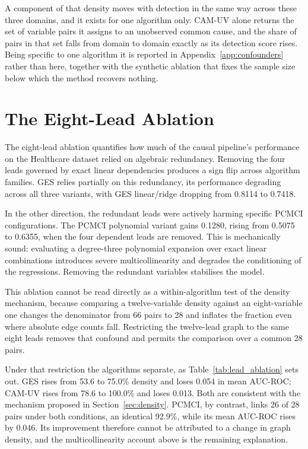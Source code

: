 A component of that density moves with detection in the same way across these three domains, and it exists for one algorithm only. CAM-UV alone returns the set of variable pairs it assigns to an unobserved common cause, and the share of pairs in that set falls from domain to domain exactly as its detection score rises. Being specific to one algorithm it is reported in Appendix~\ref{app:confounders} rather than here, together with the synthetic ablation that fixes the sample size below which the method recovers nothing.

\section{The Eight-Lead Ablation}
\label{sec:eight-lead-ablation}

The eight-lead ablation quantifies how much of the causal pipeline's performance on the Healthcare dataset relied on algebraic redundancy. Removing the four leads governed by exact linear dependencies produces a sign flip across algorithm families. GES relies partially on this redundancy, its performance degrading across all three variants, with GES linear/ridge dropping from 0.8114 to 0.7418.

In the other direction, the redundant leads were actively harming specific PCMCI configurations. The PCMCI polynomial variant gains 0.1280, rising from 0.5075 to 0.6355, when the four dependent leads are removed. This is mechanically sound: evaluating a degree-three polynomial expansion over exact linear combinations introduces severe multicollinearity and degrades the conditioning of the regressions. Removing the redundant variables stabilises the model.

This ablation cannot be read directly as a within-algorithm test of the density mechanism, because comparing a twelve-variable density against an eight-variable one changes the denominator from 66 pairs to 28 and inflates the fraction even where absolute edge counts fall. Restricting the twelve-lead graph to the same eight leads removes that confound and permits the comparison over a common 28 pairs.

Under that restriction the algorithms separate, as Table~\ref{tab:lead_ablation} sets out. GES rises from 53.6 to 75.0\% density and loses 0.054 in mean AUC-ROC; CAM-UV rises from 78.6 to 100.0\% and loses 0.013. Both are consistent with the mechanism proposed in Section~\ref{sec:density}. PCMCI, by contrast, links 26 of 28 pairs under both conditions, an identical 92.9\%, while its mean AUC-ROC rises by 0.046. Its improvement therefore cannot be attributed to a change in graph density, and the multicollinearity account above is the remaining explanation.

